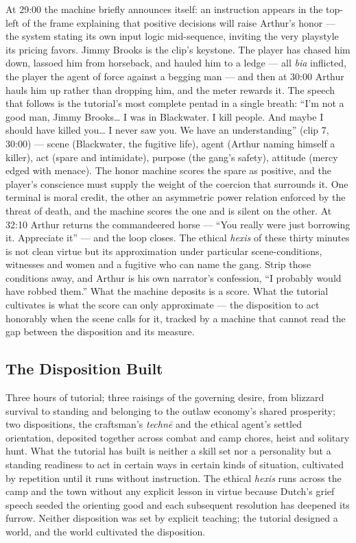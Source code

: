 At 29:00 the machine briefly announces itself: an instruction appears in the top-left of the frame explaining that positive decisions will raise Arthur's honor — the system stating its own input logic mid-sequence, inviting the very playstyle its pricing favors. Jimmy Brooks is the clip's keystone. The player has chased him down, lassoed him from horseback, and hauled him to a ledge — all \textit{bia} inflicted, the player the agent of force against a begging man — and then at 30:00 Arthur hauls him up rather than dropping him, and the meter rewards it. The speech that follows is the tutorial's most complete pentad in a single breath: ``I'm not a good man, Jimmy Brooks… I was in Blackwater. I kill people. And maybe I should have killed you… I never saw you. We have an understanding'' (clip 7, 30:00) — scene (Blackwater, the fugitive life), agent (Arthur naming himself a killer), act (spare and intimidate), purpose (the gang's safety), attitude (mercy edged with menace). The honor machine scores the spare as positive, and the player's conscience must supply the weight of the coercion that surrounds it. One terminal is moral credit, the other an asymmetric power relation enforced by the threat of death, and the machine scores the one and is silent on the other. At 32:10 Arthur returns the commandeered horse — ``You really were just borrowing it. Appreciate it'' — and the loop closes. The ethical \textit{hexis} of these thirty minutes is not clean virtue but its approximation under particular scene-conditions, witnesses and women and a fugitive who can name the gang. Strip those conditions away, and Arthur is his own narrator's confession, ``I probably would have robbed them.'' What the machine deposits is a score. What the tutorial cultivates is what the score can only approximate — the disposition to act honorably when the scene calls for it, tracked by a machine that cannot read the gap between the disposition and its measure.

\bigskip

\subsection*{The Disposition Built}

Three hours of tutorial; three raisings of the governing desire, from blizzard survival to standing and belonging to the outlaw economy's shared prosperity; two dispositions, the craftsman's \textit{technē} and the ethical agent's settled orientation, deposited together across combat and camp chores, heist and solitary hunt. What the tutorial has built is neither a skill set nor a personality but a standing readiness to act in certain ways in certain kinds of situation, cultivated by repetition until it runs without instruction. The ethical \textit{hexis} runs across the camp and the town without any explicit lesson in virtue because Dutch's grief speech seeded the orienting good and each subsequent resolution has deepened its furrow. Neither disposition was set by explicit teaching; the tutorial designed a world, and the world cultivated the disposition.

